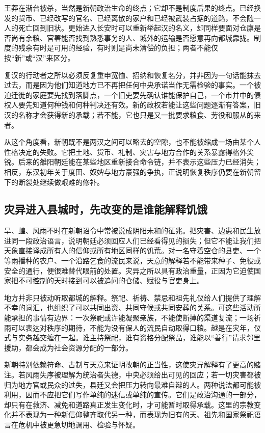 王莽在渐台被杀，当然是新朝政治生命的终点；它却不是制度后果的终点。已经换发的货币、已经改写的官名、已经离散的家户和已经被武装占据的道路，不会随一人的死亡回到旧状。更始进入长安时可以重新举起汉的名义，却同样要面对仓廪是否尚有余粮、官署能否找到熟悉事务的人、城外的运输是否愿意再向都城靠拢。制度的残余有时是可用的经验，有时则是尚未清偿的负担；两者不能仅按“新”或“汉”来区分。

复汉的行动者之所以必须反复重申宽恤、招纳和恢复名分，并非因为一句话能抹去过去，而是因为他们知道地方已不再把任何中央承诺当作无需检验的事实。一个被迫迁徙的家庭要先找到落脚点，一个旧吏要先确认谁能保护自己，一个市井中的债权人要先知道何种钱和何种判决还有效。新的政权若能让这些问题逐渐有答案，旧汉的名称才会获得新的承载；若不能，它也只是又一批要求粮食、劳役和服从的来者。

从这个角度看，新朝既不是两汉之间可以略去的空隙，也不能被缩成一场由某个人性格决定的失败。它把土地、货币、礼制、灾害与地方合作的关系暴露得格外尖锐。后来的雒阳朝廷能在某些地区重新接合命令链，并不表示这些压力已经消失；相反，东汉初年关于度田、奴婢与地方豪强的争执，正说明恢复秩序仍要在新朝留下的断裂处继续做艰难的修补。

\subsection{灾异进入县城时，先改变的是谁能解释饥饿}

旱、蝗、风雨不时在新朝诏令中常被说成阴阳未和的征兆。把灾害、边患和民生放进同一段政治语言，说明朝廷必须回应人们已经看得见的损失；但它不能让我们把天象直接译成所有人的信仰或所有地区同样的饥荒。对一名守着空仓的县吏、一个等雨播种的农户、一个沿路乞食的流民来说，天意的解释若不能带来种子、免役或安全的通行，便很难替代眼前的处置。灾异之所以具有政治重量，正因为它迫使国家把不可控制的天时接到可以被追问的仓储、赋役与官吏身上。

地方并非只被动听取都城的解释。祭祀、祈祷、禁忌和祖先礼仪给人们提供了理解不幸的词汇，也组织了可以共同出资、共同守候或共同安葬的关系。可这些活动所能承担的事情有边界：一次祭祀或许能凝聚亲族，不能使断掉的渠道复流；一场祈雨可以表达对秩序的期待，不能为没有保人的流民自动取得口粮。越是在灾年，仪式与实务越交缠在一起。谁主持祭祀，谁有资格分配祭品，谁能以“善行”请求邻里援助，都会成为社会资源分配的一部分。

新朝特别依赖符命、古制与天意来证明改朝的正当性，这使灾异解释有了更高的赌注。若风雨失序被理解为统治者失德，中央必须给出可见的回应；若一切灾害都被归为地方官或民众的过失，县廷又会把压力转向最难自辩的人。两种说法都可能被利用，因而不应把它们写作单纯的迷信或单纯的宣传。它们是政治沟通的一部分，却只有在救济、减免和道路真正发生变化时，才可能暂时取得承载。这里的宗教变化并不表现为一种新信仰整齐取代另一种，而表现为旧有的天、祖先和国家祭祀语言在危机中被更急切地调用、检验与怀疑。

